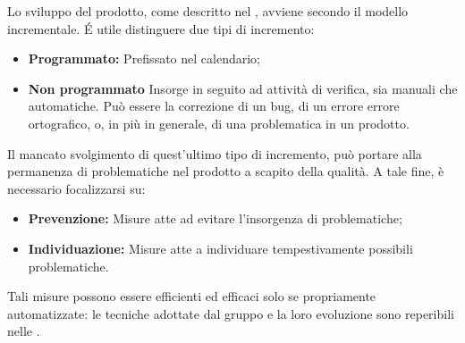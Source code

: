 Lo sviluppo del prodotto, come descritto nel \PdP , avviene secondo il {modello incrementale}. \'E utile distinguere due tipi di incremento:
\begin{itemize}
	\item \textbf{Programmato:} Prefissato nel calendario;
	\item \textbf{Non programmato} Insorge in seguito ad attività di verifica, sia manuali che automatiche. Può essere la correzione di un {bug}, di un errore errore ortografico, o, in più in generale, di una problematica in un prodotto.
\end{itemize}
Il mancato svolgimento di quest'ultimo tipo di incremento, può portare alla permanenza di problematiche nel prodotto a scapito della qualità. A tale fine, è necessario focalizzarsi su:
\begin{itemize}
	\item \textbf{Prevenzione:} Misure atte ad evitare l'insorgenza di problematiche;
	\item \textbf{Individuazione:} Misure atte a individuare tempestivamente possibili problematiche.
\end{itemize}
Tali misure possono essere {efficienti} ed {efficaci} solo se propriamente automatizzate: le tecniche adottate dal gruppo \gruppo \space e la loro evoluzione sono reperibili nelle \NdP . 
 
